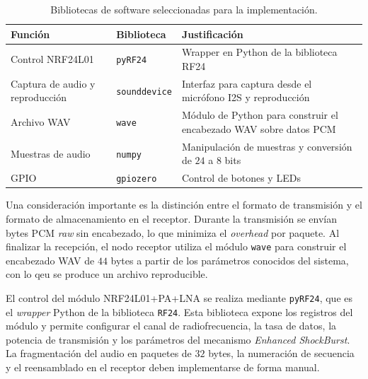 \begin{table}[htb]
    \centering
    \caption{Bibliotecas de software seleccionadas para la implementación.}
    \label{tab:bibliotecas}
    \begin{tabular}{@{}p{2.5cm}lp{3cm}@{}}
        \toprule
        Función & Biblioteca & Justificación \\
        \midrule
        Control NRF24L01    & \texttt{pyRF24} \mbox{\cite{nrf24_pyrf24}}   & Wrapper en Python de la biblioteca RF24 \\
        Captura de audio y reproducción & \texttt{sounddevice} \mbox{\cite{spatialaudio_sounddevice}} & Interfaz para captura desde el micrófono I2S y reproducción \\
        Archivo WAV         & \texttt{wave} \mbox{\cite{python_wave}}    & Módulo de Python para construir el encabezado WAV sobre datos PCM \\
        Muestras de audio   & \texttt{numpy} \mbox{\cite{numpy2025}}  & Manipulación de muestras y conversión de $24$ a $8$ bits \\
        GPIO                & \texttt{gpiozero} \mbox{\cite{gpiozero}} & Control de botones y LEDs \\
        \bottomrule
    \end{tabular}
\end{table}

Una consideración importante es la distinción entre el formato de transmisión y el formato de almacenamiento en el receptor.
Durante la transmisión se envían bytes PCM \textit{raw} sin encabezado, lo que minimiza el \textit{overhead} por paquete.
Al finalizar la recepción, el nodo receptor utiliza el módulo \texttt{wave} para construir el encabezado WAV de $44$ bytes a partir de los parámetros conocidos del sistema, con lo qeu se produce un archivo reproducible.

El control del módulo NRF24L01+PA+LNA se realiza mediante \texttt{pyRF24}, que es el \textit{wrapper} Python de la biblioteca \texttt{RF24}.
Esta biblioteca expone los registros del módulo y permite configurar el canal de radiofrecuencia, la tasa de datos, la potencia de transmisión y los parámetros del mecanismo \textit{Enhanced ShockBurst}.
La fragmentación del audio en paquetes de $32$ bytes, la numeración de secuencia y el reensamblado en el receptor deben implementarse de forma manual.